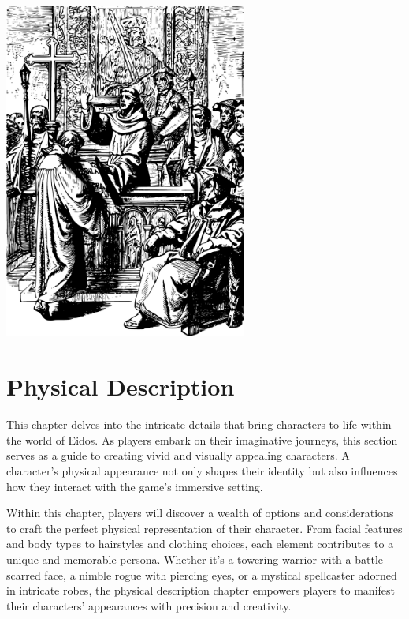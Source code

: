 \documentclass[12pt]{book}  %
\begin{document}
\begin{center}
    \includegraphics[width=0.6\textwidth]{./images/religion06.pdf}
\end{center}


\chapter{Physical Description}

This chapter delves into the intricate details that bring characters to life within the world of Eidos. As players embark on their imaginative journeys, this section serves as a guide to creating vivid and visually appealing characters. A character's physical appearance not only shapes their identity but also influences how they interact with the game's immersive setting.

Within this chapter, players will discover a wealth of options and considerations to craft the perfect physical representation of their character. From facial features and body types to hairstyles and clothing choices, each element contributes to a unique and memorable persona. Whether it's a towering warrior with a battle-scarred face, a nimble rogue with piercing eyes, or a mystical spellcaster adorned in intricate robes, the physical description chapter empowers players to manifest their characters' appearances with precision and creativity.
\end{document}
